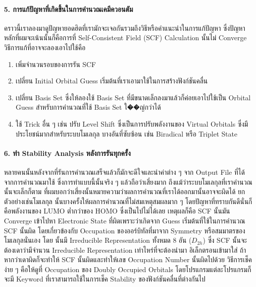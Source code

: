 \paragraph{5. การแก้ปัญหาที่เกิดขึ้นในการคำนวณเคมีควอนตัม}
คราวนี้เราลองมาดูปัญหายอดฮิตที่เรามักจะเจอกันรวมถึงวิธีหรือคำแนะนำในการแก้ปัญหา ซึ่งปัญหาหลักที่ผมจะเน้นนั้นก็คือการที่ Self-Consistent Field
(SCF) Calculation นั้นไม่ Converge วิธีการแก้ที่อาจจะลองเอาไปใช้คือ

\begin{enumerate}
  \item เพิ่มจำนวนรอบของการรัน SCF

  \item เปลี่ยน Initial Orbital Guess เริ่มต้นที่เราเอามาใช้ในการสร้างฟังก์ชันคลื่น

  \item เปลี่ยน Basis Set ซึ่งให้ลองใช้ Basis Set ที่มีขนาดเล็กลงมาแล้วก็ค่อยเอาไปใช้เป็น Orbital Guess สำหรับการคำนวณที่ใช้
        Basis Set ใ��ญ่กว่าได้

  \item ใช้ Trick อื่น ๆ เช่น ปรับ Level Shift ซึ่งเป็นการปรับพลังงานของ Virtual Orbitals ซึ่งมีประโยชน์มากสำหรับระบบโมเลกุล%
        บางอันที่ซับซ้อน เช่น Biradical หรือ Triplet State
\end{enumerate}

\paragraph{6. ทำ Stability Analysis หลังการรันทุกครั้ง}
หลายคนนั้นหลังจากที่รันการคำนวณเสร็จแล้วก็มักจะดีใจและนำค่าต่าง ๆ จาก Output File ที่ได้จากการคำนวณมาใช้ ซึ่งการทำแบบนี้นั้นจริง ๆ
แล้วถือว่าเสี่ยงมาก ถึงแม้ว่าระบบโมเลกุลที่เราคำนวณนั้นจะเล็กก็ตาม ที่ผมบอกว่าเสี่ยงนั้นหมายความว่าผลการคำนวณที่เราได้ออกมานั้นอาจจะผิดได้
ยกตัวอย่างเช่นโมเลกุล  นั้นบางครั้งให้ผลการคำนวณที่ไม่สมเหตุสมผลมาก ๆ โดยปัญหาที่ทราบกันดีนั่นก็คือพลังงานของ LUMO ต่ำกว่าของ
HOMO ซึ่งเป็นไปไม่ได้เลย เหตุผลก็คือ SCF นั้นมัน Converge เข้าไปหา Electronic State ที่ผิดเพราะว่าเกิดจาก Guess เริ่มต้นที่ใช้ในการคำนวณ
SCF นั้นผิด โดยเกี่ยวข้องกับ Occupation ของออร์บิทัลที่มาจาก Symmetry หรือสมมาตรของโมเลกุลนั่นเอง โดย  นั้นมี Irreducible
Representation ทั้งหมด 8 อัน ($D_{2h}$) ซึ่ง SCF นั้นจะต้องเดาว่ามีจำนวน Irreducible Representation เท่าไหร่ที่จะต้องนำมา%
อิเล็กตรอนเข้ามาใส่ ถ้าหากว่าเดาผิดก็จะทำให้ SCF นั้นผิดและทำให้เลข Occupation Number นั้นผิดไปด้วย วิธีการเช็คง่าย ๆ คือให้ดูที่
Occupation ของ Doubly Occupied Orbitals โดยโปรแกรมแต่ละโปรแกรมก็จะมี Keyword ที่เราสามารถใช้ในการเช็ค Stability
ของฟังก์ชันคลื่นที่ต่างกันไป

